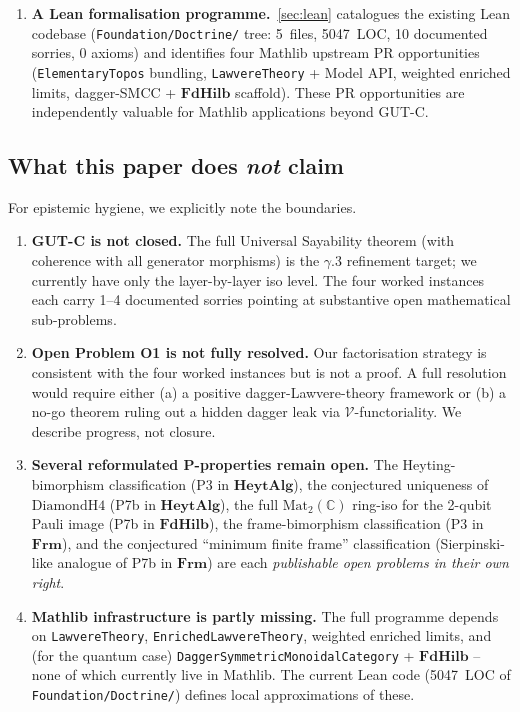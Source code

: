 \documentclass[11pt,a4paper]{article}
\theoremstyle{plain}
\theoremstyle{definition}
\theoremstyle{remark}
\newcommand{\C}{\mathbb{C}}
\newcommand{\cat}[1]{\mathbf{#1}}
\newcommand{\HeytAlg}{\cat{HeytAlg}}
\newcommand{\FdHilb}{\cat{FdHilb}}
\newcommand{\Frm}{\cat{Frm}}
\newcommand{\Mat}{\mathrm{Mat}}
\newcommand{\DiamondH}{\mathrm{DiamondH4}}
\newcommand{\smcc}{SMCC}
\begin{document}
\begin{enumerate}[leftmargin=*]
\item \textbf{A Lean formalisation programme.}~\cref{sec:lean} catalogues the existing Lean codebase (\texttt{Foundation/Doctrine/} tree: 5~files, 5047~LOC, 10 documented sorries, 0 axioms) and identifies four Mathlib upstream PR opportunities (\texttt{ElementaryTopos} bundling, \texttt{LawvereTheory} + Model API, weighted enriched limits, dagger-\smcc{} + $\FdHilb$ scaffold). These PR opportunities are independently valuable for Mathlib applications beyond GUT-C.
\end{enumerate}

\subsection{What this paper does \emph{not} claim}\label{sec:intro:notclaim}

For epistemic hygiene, we explicitly note the boundaries.

\begin{enumerate}[leftmargin=*]
\item \textbf{GUT-C is not closed.} The full Universal Sayability theorem (with coherence with all generator morphisms) is the $\gamma$.3 refinement target; we currently have only the layer-by-layer iso level. The four worked instances each carry 1--4 documented sorries pointing at substantive open mathematical sub-problems.

\item \textbf{Open Problem O1 is not fully resolved.} Our factorisation strategy is consistent with the four worked instances but is not a proof. A full resolution would require either (a) a positive dagger-Lawvere-theory framework or (b) a no-go theorem ruling out a hidden dagger leak via $\mathcal{V}$-functoriality. We describe progress, not closure.

\item \textbf{Several reformulated P-properties remain open.} The Heyting-bimorphism classification (P3 in $\HeytAlg$), the conjectured uniqueness of $\DiamondH$ (P7b in $\HeytAlg$), the full $\Mat_2(\C)$ ring-iso for the 2-qubit Pauli image (P7b in $\FdHilb$), the frame-bimorphism classification (P3 in $\Frm$), and the conjectured ``minimum finite frame'' classification (Sierpinski-like analogue of P7b in $\Frm$) are each \emph{publishable open problems in their own right}.

\item \textbf{Mathlib infrastructure is partly missing.} The full programme depends on \texttt{LawvereTheory}, \texttt{EnrichedLawvereTheory}, weighted enriched limits, and (for the quantum case) \texttt{DaggerSymmetricMonoidalCategory} + $\FdHilb$ -- none of which currently live in Mathlib. The current Lean code (5047~LOC of \texttt{Foundation/Doctrine/}) defines local approximations of these.
\end{enumerate}
\end{document}
